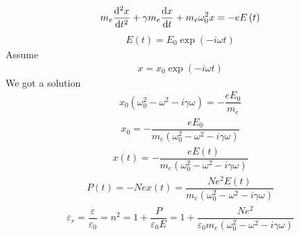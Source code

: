 \begin{equation*}
  \begin{aligned}
    m_e \dfrac{\mathop{}\!\mathrm{d} ^2 x}{\mathop{}\!\mathrm{d} t^2} + \gamma m_e \dfrac{\mathop{}\!\mathrm{d} x}{\mathop{}\!\mathrm{d} t} + m_e \omega_0^2 x = - e E \left( t \right)
  \end{aligned}
\end{equation*}
\begin{equation*}
  \begin{aligned}
    E \left( t \right) = E_0 \exp \left( - i \omega t \right)
  \end{aligned}
\end{equation*}
Assume
\begin{equation*}
  \begin{aligned}
    x = x_0 \exp \left( - i \omega t \right)
  \end{aligned}
\end{equation*}
We got a solution
\begin{equation*}
  \begin{aligned}
    x_0 \left( \omega_0^2 - \omega^2 - i \gamma \omega \right) = - \dfrac{e E_0}{m_e} 
  \end{aligned}
\end{equation*}
\begin{equation*}
  \begin{aligned}
    x_0 = - \dfrac{e E_0}{m_e \left( \omega_0^2 - \omega^2 - i \gamma \omega \right)} 
  \end{aligned}
\end{equation*}
\begin{equation*}
  \begin{aligned}
    x \left( t \right) = - \dfrac{e E \left( t \right)}{m_e \left( \omega_0^2 - \omega^2 - i \gamma \omega \right)}
  \end{aligned}
\end{equation*}
\begin{equation*}
  \begin{aligned}
    P \left( t \right) = - N e x \left( t \right) = \dfrac{N e^2 E \left( t \right)}{m_e \left( \omega_0^2 - \omega^2 - i \gamma \omega \right)} 
  \end{aligned}
\end{equation*}
\begin{equation*}
  \begin{aligned}
    \varepsilon_r = \dfrac{\varepsilon}{\varepsilon_0} = n^2 = 1 + \dfrac{P}{\varepsilon_0 E} = 1 + \dfrac{N e^2}{\varepsilon_0 m_e \left( \omega_0^2 - \omega^2 - i \gamma \omega \right)}  
  \end{aligned}
\end{equation*}
